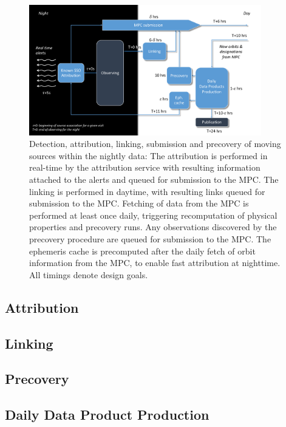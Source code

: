 \begin{figure}[th]
\begin{center}
\includegraphics[width=0.9\textwidth]{figures/solarsystempipeline.pdf}

\caption{\label{fig:apMOPS} Detection, attribution, linking, submission and
precovery of moving sources within the nightly data: The attribution is
performed in real-time by the attribution service with resulting information
attached to the alerts and queued for submission to the MPC.  The linking is
performed in daytime, with resulting links queued for submission to the MPC.
Fetching of data from the MPC is performed at least once daily, triggering
recomputation of physical properties and precovery runs.  Any observations
discovered by the precovery procedure are queued for submission to the MPC.
The ephemeris cache is precomputed after the daily fetch of orbit
information from the MPC, to enable fast attribution at nighttime.  All
timings denote design goals.  }

\end{center}
\end{figure}

\subsection{Attribution}
\subsection{Linking}
\subsection{Precovery}
\subsection{Daily Data Product Production}


